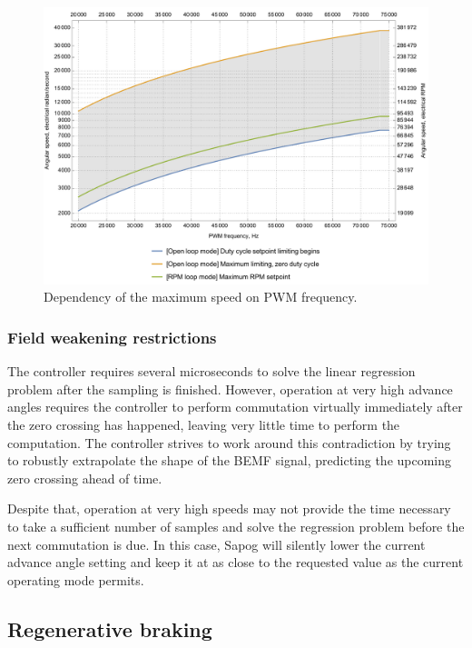 \documentclass{zubaxdoc}
\begin{document}
\begin{figure}[hbt]
    \centering
	\includegraphics[width=\textwidth]{pwm_maximum_speed}
	\caption{Dependency of the maximum speed on PWM frequency.
	\label{pwm_maximum_speed}}
\end{figure}

\subsubsection{Field weakening restrictions}

The controller requires several microseconds to solve the linear regression problem after the sampling is
finished.
However, operation at very high advance angles requires the controller to perform commutation virtually
immediately after the zero crossing has happened, leaving very little time to perform the computation.
The controller strives to work around this contradiction by trying to robustly extrapolate the shape of the
BEMF signal, predicting the upcoming zero crossing ahead of time.

Despite that, operation at very high speeds may not provide the time necessary to take a sufficient
number of samples and solve the regression problem before the next commutation is due.
In this case, Sapog will silently lower the current advance angle setting and keep it at as close
to the requested value as the current operating mode permits.

\subsection{Regenerative braking}
\end{document}
